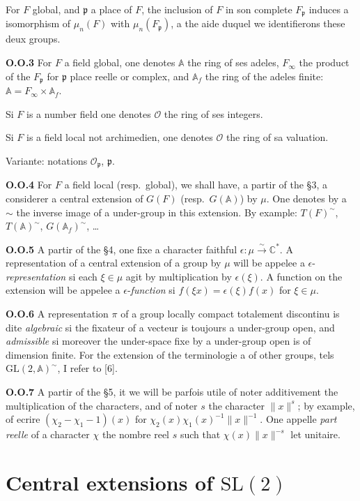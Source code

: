 \documentclass[12pt,a4paper]{article}
\theoremstyle{plain}
\theoremstyle{definition}
\theoremstyle{remark}
\newcommand{\CC}{\mathbb{C}}
\newcommand{\Af}{\mathbb{A}}
\newcommand{\cO}{\mathcal{O}}
\newcommand{\frakp}{\mathfrak{p}}
\providecommand{\CC}{\mathbb{C}}
\providecommand{\cO}{\mathcal{O}}
\providecommand{\frakp}{\mathfrak{p}}
\begin{document}
For $F$ global, and $\frakp$ a place of $F$, the inclusion of $F$ in son complete $F_\frakp$ induces a isomorphism of $\mu_n(F)$ with $\mu_n(F_\frakp)$, a the aide duquel we identifierons these deux groups.

\textbf{O.O.3} For $F$ a field global, one denotes $\Af$ the ring of ses adeles, $F_\infty$ the product of the $F_\frakp$ for $\frakp$ place reelle or complex, and $\Af_f$ the ring of the adeles finite: $\Af = F_\infty \times \Af_f$.

Si $F$ is a number field one denotes $\cO$ the ring of ses integers.

Si $F$ is a field local not archimedien, one denotes $\cO$ the ring of sa valuation.

Variante: notations $\cO_\frakp$, $\frakp$.

\textbf{O.O.4} For $F$ a field local (resp.\ global), we shall have, a partir of the \S 3, a considerer a central extension of $G(F)$ (resp.\ $G(\Af)$) by $\mu$. One denotes by a $\sim$ the inverse image of a under-group in this extension. By example: $T(F)^\sim$, $T(\Af)^\sim$, $G(\Af_f)^\sim$, \ldots

\textbf{O.O.5} A partir of the \S 4, one fixe a character faithful $\epsilon : \mu \xrightarrow{\sim} \CC^*$. A representation of a central extension of a group by $\mu$ will be appelee a $\epsilon$-\emph{representation} si each $\xi \in \mu$ agit by multiplication by $\epsilon(\xi)$. A function on the extension will be appelee a $\epsilon$-\emph{function} si $f(\xi x) = \epsilon(\xi) f(x)$ for $\xi \in \mu$.

\textbf{O.O.6} A representation $\pi$ of a group locally compact totalement discontinu is dite \emph{algebraic} si the fixateur of a vecteur is toujours a under-group open, and \emph{admissible} si moreover the under-space fixe by a under-group open is of dimension finite. For the extension of the terminologie a of other groups, tels $\mathrm{GL}(2, \Af)^\sim$, I refer to [6].

\textbf{O.O.7} A partir of the \S 5, it we will be parfois utile of noter additivement the multiplication of the characters, and of noter $s$ the character $\|x\|^s$; by example, of ecrire $(\chi_2 - \chi_1 - 1)(x)$ for $\chi_2(x) \chi_1(x)^{-1} \|x\|^{-1}$. One appelle \emph{part reelle} of a character $\chi$ the nombre reel $s$ such that $\chi(x) \|x\|^{-s}$ let unitaire.

\section{Central extensions of $\mathrm{SL}(2)$}
\end{document}
